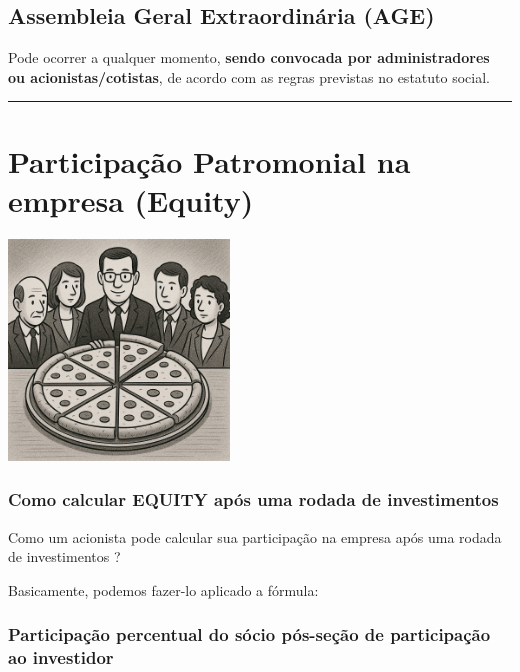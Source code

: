 \documentclass[
]{book}
\begin{document}
\subsection{\texorpdfstring{\textbf{Assembleia Geral Extraordinária (AGE)}}{Assembleia Geral Extraordinária (AGE)}}\label{assembleia-geral-extraordinuxe1ria-age}

Pode ocorrer a qualquer momento, \textbf{sendo convocada por administradores ou acionistas/cotistas}, de acordo com as regras previstas no estatuto social.

\begin{center}\rule{0.5\linewidth}{0.5pt}\end{center}

\section{Participação Patromonial na empresa (Equity)}\label{participauxe7uxe3o-patromonial-na-empresa-equity}

\includegraphics[width=2.3125in,height=\textheight]{images/03-2025-08-19_20/02-assembleia_cotistas-equity.jpg}

\subsubsection{Como calcular EQUITY após uma rodada de investimentos}\label{como-calcular-equity-apuxf3s-uma-rodada-de-investimentos}

Como um acionista pode calcular sua participação na empresa após uma rodada de investimentos ?

Basicamente, podemos fazer-lo aplicado a fórmula:

\subsubsection{Participação percentual do sócio pós-seção de participação ao investidor}\label{participauxe7uxe3o-percentual-do-suxf3cio-puxf3s-seuxe7uxe3o-de-participauxe7uxe3o-ao-investidor}
\end{document}
